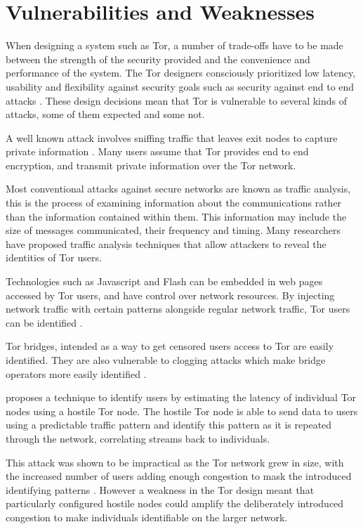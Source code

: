 \documentclass{ecuthesis}
\begin{document}
\section{Vulnerabilities and Weaknesses}

When designing a system such as Tor, a number of trade-offs have to be made
between the strength of the security provided and the convenience and
performance of the system. The Tor designers consciously prioritized low
latency, usability and flexibility against security goals such as security
against end to end attacks \parencite[4]{Dingledine:2004p314}. These design
decisions mean that Tor is vulnerable to several kinds of attacks, some of them
expected and some not.

A well known attack involves sniffing traffic that leaves exit nodes to
capture private information \parencite{website:tor-password-leak}. Many users
assume that Tor provides end to end encryption, and transmit private information
over the Tor network.

Most conventional attacks against secure networks are known as traffic analysis,
this is the process of examining information about the communications rather
than the information contained within them. This information may include the
size of messages communicated, their frequency and timing. Many researchers have
proposed traffic analysis techniques that allow attackers to reveal the
identities of Tor users. 

Technologies such as Javascript and Flash can be embedded in web pages accessed
by Tor users, and have control over network resources. By injecting network
traffic with certain patterns alongside regular network traffic, Tor users can
be identified \parencite{Abbott:2007p298}.

Tor bridges, intended as a way to get censored users access to Tor are easily
identified. They are also vulnerable to clogging attacks which make bridge
operators more easily identified \textcite{McLachlan:2009p197}. 

\textcite{Murdoch:2005p325} proposes a technique to identify users by estimating
the latency of individual Tor nodes using a hostile Tor node. The hostile Tor
node is able to send data to users using a predictable traffic pattern and
identify this pattern as it is repeated through the network, correlating streams
back to individuals.

This attack was shown to be impractical as the Tor network grew in size, with 
the increased number of users adding enough congestion to mask the introduced
identifying patterns \parencite{Evans:2009p315}. However a weakness in the Tor
design meant that particularly configured hostile nodes could amplify the
deliberately introduced congestion to make individuals identifiable on the
larger network.
\end{document}
